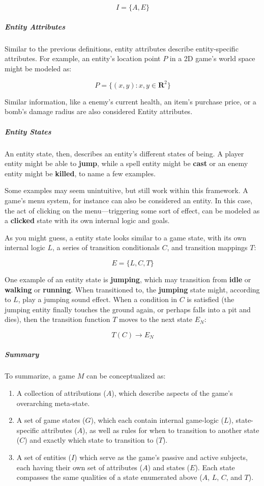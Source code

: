 \documentclass{report}
\begin{document}
$$I = \{A, E\}$$

\subparagraph{Entity Attributes}
Similar to the previous definitions, entity attributes describe entity-specific attributes. For example, an entity's location point $P$ in a 2D game's world space might be modeled as:

$$P = \{(x,y): x,y \in \mathbf{R} ^2\}$$ 

Similar information, like a enemy's current health, an item's purchase price, or a bomb's damage radius are also considered Entity attributes. 

\subparagraph{Entity States}
An entity state, then, describes an entity's different states of being. A player entity might be able to \textbf{jump}, while a spell entity might be \textbf{cast} or an enemy entity might be \textbf{killed}, to name a few examples. 

Some examples may seem unintuitive, but still work within this framework. A game's menu system, for instance can also be considered an entity. In this case, the act of clicking on the menu---triggering some sort of effect, can be modeled as a \textbf{clicked} state with its own internal logic and goals. 

As you might guess, a entity state looks similar to a game state, with its own internal logic $L$, a series of transition conditionals $C$, and transition mappings $T$:

$$E = \{L, C, T\}$$

One example of an entity state is \textbf{jumping}, which may transition from \textbf{idle} or \textbf{walking} or \textbf{running}. When transitioned to, the \textbf{jumping} state might, according to $L$, play a jumping sound effect. When a condition in $C$ is satisfied (the jumping entity finally touches the ground again, or perhaps falls into a pit and dies), then the transition function $T$ moves to the next state $E_N$:

$$T(C) \longrightarrow E_N$$

\subparagraph{Summary}
To summarize, a game $M$ can be conceptualized as:

\begin{enumerate}
    \item A collection of attributions ($A$), which describe aspects of the game's overarching meta-state.
    \item A set of game states ($G$), which each contain internal game-logic ($L$), state-specific attributes ($A$), as well as rules for when to transition to another state ($C$) and exactly which state to transition to ($T$).   
    \item A set of entities ($I$) which serve as the game's passive and active subjects, each having their own set of attributes ($A$) and states ($E$). Each state compasses the same qualities of a state enumerated above ($A$, $L$, $C$, and $T$).   
\end{enumerate}
\end{document}
